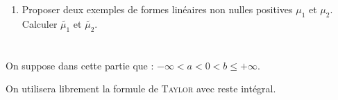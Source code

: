 \documentclass[a4paper,french,bookmarks]{article}
\begin{document}
\begin{enumerate}
\begin{enumerate}
            \item Proposer deux exemples de formes linéaires non nulles positives $\mu_1$ et $\mu_2$. Calculer $\widetilde{\mu_1}$ et $\widetilde{\mu_2}$.
            
        \end{enumerate}
    \end{enumerate}
    
    \section{}
    
    On suppose dans cette partie que : $-\infty < a < 0 < b \leq +\infty$.
    
    On utilisera librement la formule de \textsc{Taylor} avec reste intégral.
    
\end{document}
